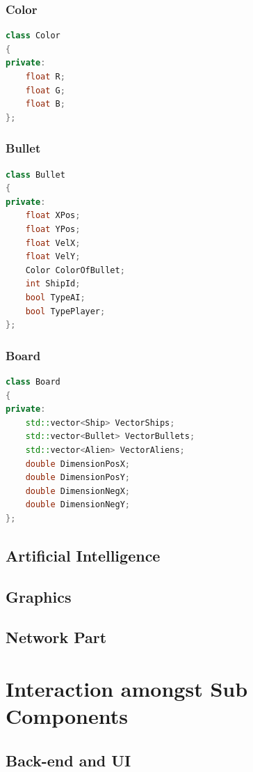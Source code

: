 \documentclass{article}
\begin{document}
				\subsubsection{Color}
					\begin{lstlisting}[language=C++, caption={Class Parameters for Color}]
class Color
{
private:
	float R;
	float G;
	float B;
};
					\end{lstlisting}
				\subsubsection{Bullet}
					\begin{lstlisting}[language=C++, caption={Class Parameters for Bullet}]
class Bullet
{
private:
	float XPos;
	float YPos;
	float VelX;
	float VelY;
	Color ColorOfBullet;
	int ShipId;	
	bool TypeAI;
	bool TypePlayer;
};
					\end{lstlisting}
				\subsubsection{Board}
					\begin{lstlisting}[language=C++, caption={Class Parameters for Board}]
class Board
{
private:
	std::vector<Ship> VectorShips;
	std::vector<Bullet> VectorBullets;		
	std::vector<Alien> VectorAliens;
	double DimensionPosX;
	double DimensionPosY;
	double DimensionNegX;
	double DimensionNegY;	
};
					\end{lstlisting}
			\subsection{Artificial Intelligence}
			\subsection{Graphics}
			\subsection{Network Part}
	\section{Interaction amongst Sub Components}
			\subsection{Back-end and UI}
\end{document}
